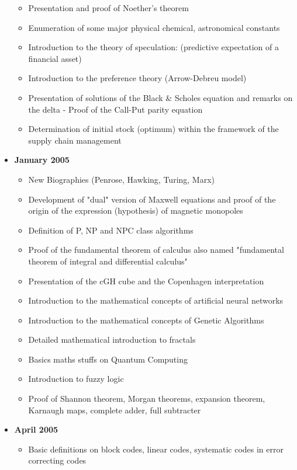 \documentclass[12pt,a4paper,twoside,openright]{report}
\newcounter{def}
\theoremstyle{definition}
\theoremstyle{itexmp}
\numberwithin{equation}{section}
\begin{document}
\begin{itemize}
\begin{itemize}[noitemsep]
			\item Presentation and proof of Noether's theorem
			\item Enumeration of some major physical chemical, astronomical constants
			\item Introduction to the theory of speculation: (predictive expectation of a financial asset)
			\item Introduction to the preference theory (Arrow-Debreu model)
			\item Presentation of solutions of the Black \& Scholes equation and remarks on the delta - Proof of the Call-Put parity equation
			\item Determination of initial stock (optimum) within the framework of the supply chain management
		\end{itemize}
	\item \textbf{January 2005}
		\begin{itemize}[noitemsep]
			\item New Biographies (Penrose, Hawking, Turing, Marx) 
			\item Development of "dual" version of Maxwell equations and proof of the origin of the expression (hypothesis) of magnetic monopoles 
			\item Definition of P, NP and NPC class algorithms
			\item Proof of the fundamental theorem of calculus also named "fundamental theorem of integral and differential calculus" 
			\item Presentation of the cGH cube and the Copenhagen interpretation 
			\item Introduction to the mathematical concepts of artificial neural networks 
			\item Introduction to the mathematical concepts of Genetic Algorithms
			\item Detailed mathematical introduction to fractals
			\item Basics maths stuffs on Quantum Computing
			\item Introduction to fuzzy logic
			\item Proof of Shannon theorem, Morgan theorems, expansion theorem, Karnaugh maps, complete adder, full subtracter
		\end{itemize}
	\item \textbf{April 2005}
		\begin{itemize}[noitemsep]
			\item Basic definitions on block codes, linear codes, systematic codes in error correcting codes

\end{itemize}
\end{itemize}
\end{document}
